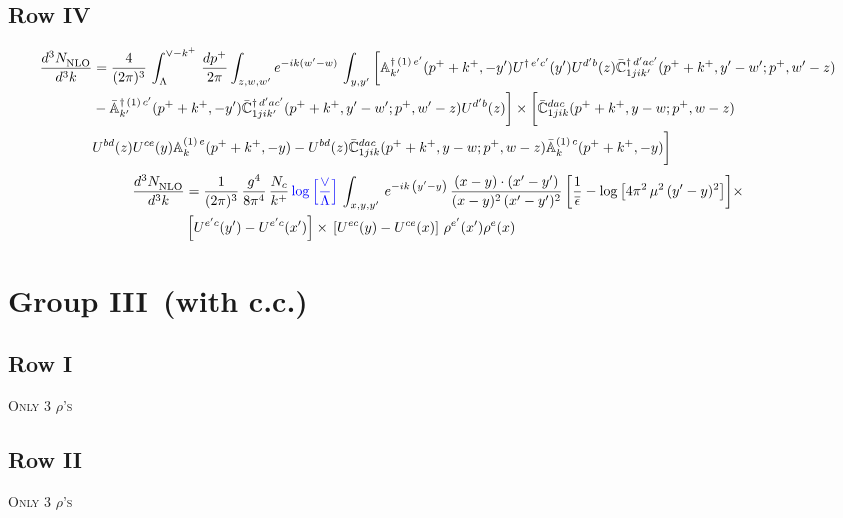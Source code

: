 \documentclass[9pt]{article}
\def\mf#1{\mathbb{#1}}
\numberwithin{equation}{section}
\begin{document}
\subsection{{\color{green}Row IV}}
\begin{align}
    \frac{d^{3}N_{\rm NLO}^{\rm}}{d^{3}k}  & = \frac{4}{(2\pi)^{3}}\,\int_{\Lambda}^{\vee-k^{+}}\, \frac{dp^{+}}{2\pi}\int_{z,w,w^{\prime}} e^{-ik(w^{\prime}-w)}\,  \int_{y,y^{\prime}}\bigg[\mf{A}^{\dagger\, (1)\,e^{\prime}}_{k^{\prime}}(p^{+}+k^{+},-y^{\prime})U^{\dagger\, e^{\prime}c^{\prime}}(y^{\prime})U^{d^{\prime}b}(z) \Bar{\mf{C}}^{\dagger\, d^{\prime}ac^{\prime}}_{1jik^{\prime}}(p^{+}+k^{+},y^{\prime}-w^{\prime}; p^{+},w^{\prime}-z) \notag \\ &  -\Bar{\mf{A}}^{\dagger\, (1)\,c^{\prime}}_{k^{\prime}}(p^{+}+k^{+},-y^{\prime}) \Bar{\mf{C}}^{\dagger\, d^{\prime}ac^{\prime}}_{1jik^{\prime}}(p^{+}+k^{+},y^{\prime}-w^{\prime}; p^{+},w^{\prime}-z)U^{d^{\prime}b}(z)\bigg]\times\bigg[\Bar{\mf{C}}^{dac}_{1jik}(p^{+}+k^{+},y-w; p^{+},w-z)\notag \\ & U^{bd}(z)U^{ce}(y) \mf{A}^{(1)\,e}_{k}(p^{+}+k^{+},-y) -U^{bd}(z) \Bar{\mf{C}}^{dac}_{1jik}(p^{+}+k^{+},y-w; p^{+},w-z)\Bar{\mf{A}}^{(1)\,c}_{k}(p^{+}+k^{+},-y)\bigg]\nonumber
\end{align}
\begin{align}
    \frac{d^{3}N_{\rm NLO}^{\rm}}{d^{3}k}  & = \frac{1}{(2\pi)^{3}}\,\frac{g^{4}}{8\pi^{4}}\,\frac{N_{c}}{k^{+}}\,{\color{blue}\log{\left[\frac{\vee}{\Lambda}\right]}}\,\int_{x,y,y^{\prime}}\,e^{-ik\,\left(y'-y\right)}\,\frac{(x-y)\cdot(x'-y')}{(x-y)^{2}\,(x'-y')^{2}}\, \bigg[\frac{1}{\overline{\epsilon}} -\log{\left[4\pi^{2}\,\mu^{2}\,(y'-y)^{2}\right]}\bigg]\times\notag \\ &  \left[U^{e'c}(y') - U^{e'c}(x')\right] \times\, \left[U^{ec}(y) - U^{ce}(x)\right]\, \rho^{e'}(x') \rho^{e}(x)
\end{align}
\section{Group III\, (with c.c.)}
\subsection{Row I}
\textsc{Only 3 $\rho$'s}
\subsection{Row II}
\textsc{Only 3 $\rho$'s}
\end{document}
